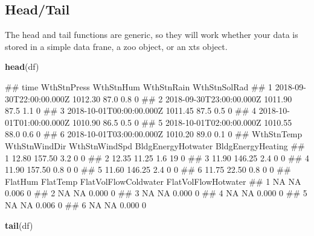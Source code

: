 \documentclass[
]{book}
\newenvironment{Shaded}{\begin{snugshade}}{\end{snugshade}}
\newcommand{\KeywordTok}[1]{\textcolor[rgb]{0.13,0.29,0.53}{\textbf{#1}}}
\newcommand{\NormalTok}[1]{#1}
\let\oldShaded\Shaded
\let\endoldShaded\endShaded
\renewenvironment{Shaded}{\footnotesize\oldShaded}{\endoldShaded}
\let\oldverbatim\verbatim
\let\endoldverbatim\endverbatim
\renewenvironment{verbatim}{\footnotesize\oldverbatim}{\endoldverbatim}
\begin{document}
\hypertarget{headtail}{%
\subsection{Head/Tail}\label{headtail}}

The head and tail functions are generic, so they will work whether your data is stored in a simple data frane, a zoo object, or an xts object.

\begin{Shaded}
\begin{Highlighting}[]
\KeywordTok{head}\NormalTok{(df)}
\end{Highlighting}
\end{Shaded}

\begin{verbatim}
##                       time WthStnPress WthStnHum WthStnRain WthStnSolRad
## 1 2018-09-30T22:00:00.000Z     1012.30      87.0        0.8            0
## 2 2018-09-30T23:00:00.000Z     1011.90      87.5        1.1            0
## 3 2018-10-01T00:00:00.000Z     1011.45      87.5        0.5            0
## 4 2018-10-01T01:00:00.000Z     1010.90      86.5        0.5            0
## 5 2018-10-01T02:00:00.000Z     1010.55      88.0        0.6            0
## 6 2018-10-01T03:00:00.000Z     1010.20      89.0        0.1            0
##   WthStnTemp WthStnWindDir WthStnWindSpd BldgEnergyHotwater BldgEnergyHeating
## 1      12.80        157.50           3.2                  0                 0
## 2      12.35         11.25           1.6                 19                 0
## 3      11.90        146.25           2.4                  0                 0
## 4      11.90        157.50           0.8                  0                 0
## 5      11.60        146.25           2.4                  0                 0
## 6      11.75         22.50           0.8                  0                 0
##   FlatHum FlatTemp FlatVolFlowColdwater FlatVolFlowHotwater
## 1      NA       NA                0.006                   0
## 2      NA       NA                0.000                   0
## 3      NA       NA                0.000                   0
## 4      NA       NA                0.000                   0
## 5      NA       NA                0.006                   0
## 6      NA       NA                0.000                   0
\end{verbatim}

\begin{Shaded}
\begin{Highlighting}[]
\KeywordTok{tail}\NormalTok{(df)}
\end{Highlighting}
\end{Shaded}
\end{document}
